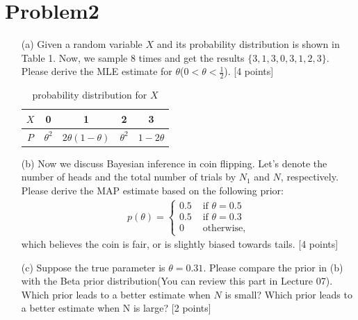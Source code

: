 \documentclass[10pt]{article}
\begin{document}
\section{Problem2}

\begin{enumerate}
    \item[(a)] 
    Given a random variable $X$ and its probability distribution is shown in Table 1. Now, we sample 8 times and get the results $\{3,1,3,0,3,1,2,3\}$. Please derive the MLE estimate for $\theta$($0 < \theta < \frac{1}{2}$). {\color{red} [4 points]} \\
    \begin{table}[t]
      \caption{probability distribution for $X$}
      \label{table1}
      \centering
      \begin{tabular}{c|c|c|c|c}
        \hline
        $X$ & 0 & 1 & 2 & 3 \\ \hline
        $P$ & $\theta^{2}$ & $2\theta(1-\theta)$ & $\theta^{2}$ & $1-2\theta$ \\
        \hline
      \end{tabular}
    \end{table}
    
    \item[(b)]
    Now we discuss Bayesian inference in coin flipping. Let's denote the number of heads and the total number of trials by $N_1$ and $N$, respectively. Please derive the MAP estimate based on the following prior:
    \begin{align*}
        p(\theta)=\left\{\begin{array}{ll}
        0.5 & \text { if } \theta=0.5 \\
        0.5 & \text { if } \theta=0.3 \\
        0   & \text { otherwise,}
        \end{array}\right.
    \end{align*}
    which believes the coin is fair, or is slightly biased towards tails. {\color{red} [4 points]} \\
    
    \item[(c)]
    Suppose the true parameter is $\theta = 0.31$. Please compare the prior in (b) with the Beta prior distribution(You can review this part in Lecture 07). Which prior leads to a better estimate when $N$ is small? Which prior leads to a better estimate when N is large? {\color{red} [2 points]} \\


\end{enumerate}
\end{document}
